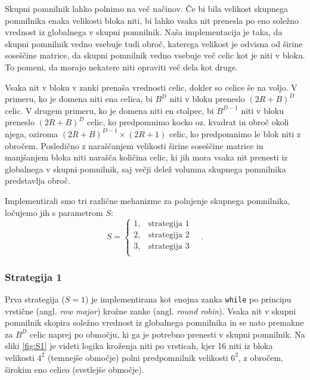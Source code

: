 \documentclass[a4paper, 12pt, openright]{book}
\begin{document}
Skupni pomnilnik lahko polnimo na več načinov. Če bi bila velikost skupnega pomnilnika enaka velikosti bloka niti, bi lahko vsaka nit prenesla po eno soležno vrednost iz globalnega v skupni pomnilnik. Naša implementacija je taka, da skupni pomnilnik vedno vsebuje tudi obroč, katerega velikost je odvisna od širine soseščine matrice, da skupni pomnilnik vedno vsebuje več celic kot je niti v bloku. To pomeni, da morajo nekatere niti opraviti več dela kot druge.

Vsaka nit v bloku v zanki prenaša vrednosti celic, dokler so celice še na voljo.
V primeru, ko je domena niti ena celica, bi \(B^D\) niti v bloku preneslo \((2R + B)^D\) celic.
V drugem primeru, ko je domena niti en stolpec, bi \(B^{D - 1}\) niti v bloku preneslo \((2R + B)^D\) celic, ko predpomnimo kocko oz. kvadrat in obroč okoli njega, oziroma \((2R + B)^{D - 1} \times (2R + 1)\) celic, ko predpomnimo le blok niti z obročem.
Posledično z naraščanjem velikosti širine soseščine matrice in manjšanjem bloka niti narašča količina celic, ki jih mora vsaka nit prenesti iz globalnega v skupni pomnilnik, saj večji delež volumna skupnega pomnilnika predstavlja obroč.

Implementirali smo tri različne mehanizme za polnjenje skupnega pomnilnika, ločujemo jih s parametrom \(S\):
\begin{displaymath}
    S = \begin{cases}
        1, & \text{strategija 1} \\
        2, & \text{strategija 2} \\
        3, & \text{strategija 3} \\
    \end{cases}\quad.
\end{displaymath}

\subsubsection{Strategija 1}

Prva strategija (\(S=1\)) je implementirana kot enojna zanka \texttt{while} po principu vrstične (angl. \textit{row major}) krožne zanke (angl. \textit{round robin}).
Vsaka nit v skupni pomnilnik skopira soležno vrednost iz globalnega pomnilnika in se nato premakne za \(B^D\) celic naprej po območju, ki ga je potrebno prenesti v skupni pomnilnik.
Na sliki \ref{fig:S1} je videti logika kroženja niti po vrsticah, kjer 16 niti iz bloka velikosti \(4^2\) (temnejše območje) polni predpomnilnik velikosti \(6^2\), z obročem, širokim eno celico (svetlejše območje).
\end{document}
